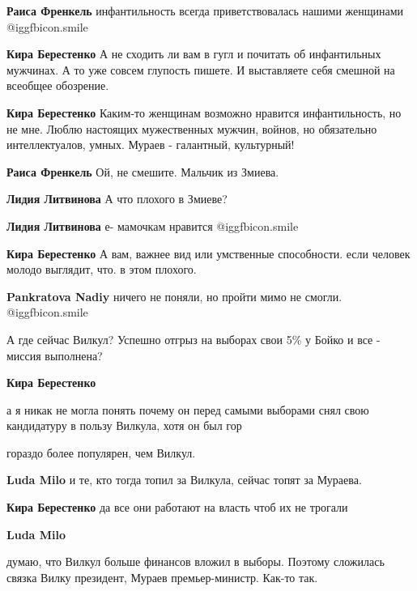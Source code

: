 \begin{itemize}
\begin{itemize}
\textbf{Раиса Френкель} инфантильность всегда приветствовалась нашими женщинами  @igg{fbicon.smile} 

\textbf{Кира Берестенко} А не сходить ли вам в гугл и почитать об инфантильных мужчинах. А то уже совсем глупость пишете. И выставляете себя смешной на всеобщее обозрение.

\textbf{Кира Берестенко} Каким-то женщинам возможно нравится инфантильность, но не мне. Люблю настоящих мужественных мужчин, войнов, но обязательно интеллектуалов, умных. Мураев - галантный, культурный!

\textbf{Раиса Френкель} Ой, не смешите. Мальчик из Змиева.

\textbf{Лидия Литвинова} А что плохого в Змиеве?

\textbf{Лидия Литвинова} е- мамочкам нравится  @igg{fbicon.smile} 

\textbf{Кира Берестенко} А вам, важнее вид или умственные способности. если человек молодо выглядит, что. в этом плохого.

\textbf{Pankratova Nadiy} ничего не поняли, но пройти мимо не смогли.  @igg{fbicon.smile} 
\end{itemize} %

А где сейчас Вилкул? Успешно отгрыз на выборах свои 5\% у Бойко и все - миссия выполнена?

\begin{itemize} %
\textbf{Кира Берестенко} 

а я никак не могла понять почему он перед самыми выборами снял свою кандидатуру
в пользу Вилкула, хотя он был гор

гораздо более популярен, чем Вилкул.

\textbf{Luda Milo} и те, кто тогда топил за Вилкула, сейчас топят за Мураева.

\textbf{Кира Берестенко} да все они работают на власть чтоб их не трогали

\textbf{Luda Milo} 

думаю, что Вилкул больше финансов вложил в выборы. Поэтому сложилась связка
Вилку президент, Мураев премьер-министр. Как-то так.

\end{itemize} %


\end{itemize}
